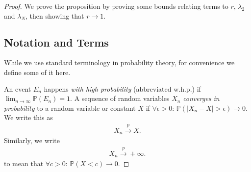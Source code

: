 \begin{proof}
We prove the proposition by proving some bounds relating terms to $r$, $\lambda_{2}$ and $\lambda_{N}$, then showing that $r \to 1$.
\subsection{Notation and Terms}
While we use standard terminology in probability theory, for convenience we define some of it here.

An event $E_{n}$ happens \emph{with high probability} (abbreviated w.h.p.) if $\lim_{n \to \infty} \mathbb{P}(E_{n}) = 1$.
A sequence of random variables $X_{n}$ \emph{converges in probability} to a random variable or constant $X$ if $\forall \epsilon>0:\, \mathbb{P}(\left\lvert X_{n} - X \right\rvert > \epsilon) \to 0$. We write this as
\begin{align}
    X_{n} \overset{p}{\to} X.
\end{align}
Similarly, we write
\begin{align}
    X_{n} \overset{p}{\to} +\infty.
\end{align}
to mean that $\forall c>0:\, \mathbb{P}( X < c) \to 0$.

\end{proof}
